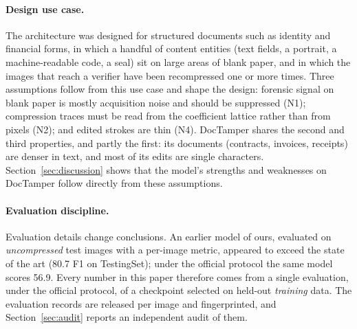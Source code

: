 \documentclass[11pt,a4paper]{article}
\begin{document}
\paragraph{Design use case.} The architecture was designed for structured documents such as
identity and financial forms, in which a handful of content entities (text fields, a portrait,
a machine-readable code, a seal) sit on large areas of blank paper, and in which the images that
reach a verifier have been recompressed one or more times. Three assumptions follow from this
use case and shape the design: forensic signal on blank paper is mostly acquisition noise and
should be suppressed (N1); compression traces must be read from the coefficient lattice rather
than from pixels (N2); and edited strokes are thin (N4). DocTamper shares the second and third
properties, and partly the first: its documents (contracts, invoices, receipts) are denser in
text, and most of its edits are single characters. Section~\ref{sec:discussion} shows that the
model's strengths and weaknesses on DocTamper follow directly from these assumptions.

\paragraph{Evaluation discipline.} Evaluation details change conclusions. An earlier model of
ours, evaluated on \emph{uncompressed} test images with a per-image metric, appeared to exceed
the state of the art (80.7 F1 on TestingSet); under the official protocol the same model scores
56.9. Every number in this paper therefore comes from a single evaluation, under the official
protocol, of a checkpoint selected on held-out \emph{training} data. The evaluation records
are released per image and fingerprinted, and Section~\ref{sec:audit} reports an independent
audit of them.
\end{document}

